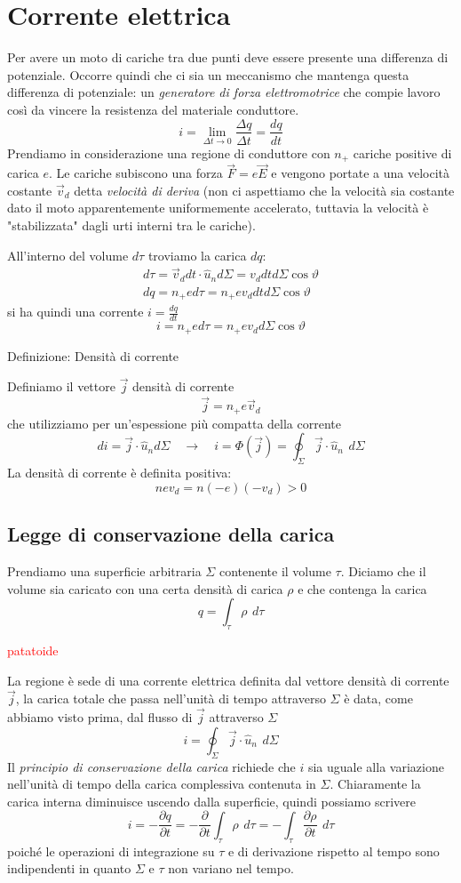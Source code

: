 \documentclass[x11names]{report}
\newcommand{\definizione}[2]{
	\begin{center}
		\fboxsep11pt
		\colorbox{myblue}{\begin{minipage}{5.75in}
				\begin{blues}{Definizione: #1}
					#2
				\end{blues}
		\end{minipage}}
	\end{center}
}
\begin{document}
\section{Corrente elettrica}
Per avere un moto di cariche tra due punti deve essere presente una differenza di potenziale. Occorre quindi che ci sia un meccanismo che mantenga questa differenza di potenziale: un \textit{generatore di forza elettromotrice} che compie lavoro così da vincere la resistenza del materiale conduttore.
\[
i =  \lim_{\Delta t \to 0} \frac{\Delta q}{\Delta t} = \frac{dq}{dt}
\]
Prendiamo in considerazione una regione di conduttore con \(n_+\) cariche positive di carica \(e\). Le cariche subiscono una forza \(\vec{F} = e\vec{E}\) e vengono portate a una velocità costante \(\vec{v}_d\) detta \textit{velocità di deriva} (non ci aspettiamo che la velocità sia costante dato il moto apparentemente uniformemente accelerato, tuttavia la velocità è "stabilizzata" dagli urti interni tra le cariche).

All'interno del volume \(d\tau\) troviamo la carica \(dq\):
\begin{gather*}
	d\tau = \vec{v}_d dt \cdot \hat{u}_n d\Sigma = v_d dt d\Sigma \cos\vartheta \\
	dq = n_+ e d\tau = n_+ e v_d dt d\Sigma \cos\vartheta
\end{gather*}
si ha quindi una corrente \(i = \frac{dq}{dt}\) 
\[
i =  n_+ e d\tau = n_+ e v_d  d\Sigma \cos\vartheta
\]

\definizione{Densità di corrente}{
Definiamo il vettore \(\vec{j}\) densità di corrente 
\[
\vec{j} = n_+ e \vec{v}_d 
\]
che utilizziamo per un'espessione più compatta della corrente
\[
di = \vec{j}\cdot\hat{u}_n d\Sigma \quad \to \quad i = \Phi(\vec{j}) = \oint_\Sigma  \vec{j} \cdot \hat{u}_n \,\ d\Sigma
\]
La densità di corrente è definita positiva:
\[
n e v_d = n (-e)(-v_d) > 0
\]
}
\subsection{Legge di conservazione della carica}
Prendiamo una superficie arbitraria \(\Sigma\) contenente il volume \(\tau\). Diciamo che il volume sia caricato con una certa densità di carica \(\rho\) e che contenga la carica
\[
q = \int_\tau \rho \,\ d\tau
\]
\begin{center}
	\textcolor{red}{patatoide}
\end{center}
La regione è sede di una corrente elettrica definita dal vettore densità di corrente \(\vec{j}\), la carica totale che passa nell'unità di tempo attraverso \(\Sigma\) è data, come abbiamo visto prima, dal flusso di \(\vec{j}\) attraverso \(\Sigma\)
\[
i = \oint_{\Sigma} \vec{j}\cdot \hat{u}_n \,\ d\Sigma
\]
Il \textit{principio di conservazione della carica} richiede che \(i\) sia uguale alla variazione nell'unità di tempo della carica complessiva contenuta in \(\Sigma\). Chiaramente la carica interna diminuisce uscendo dalla superficie, quindi possiamo scrivere
\[
i = - \frac{\partial q}{\partial t} = -\frac{\partial}{\partial t}\int_\tau \rho \,\ d\tau = -\int_\tau \frac{\partial\rho}{\partial t} \,\ d\tau
\]
poiché le operazioni di integrazione su \(\tau\) e di derivazione rispetto al tempo sono indipendenti in quanto \(\Sigma\) e \(\tau\) non variano nel tempo.
\end{document}
